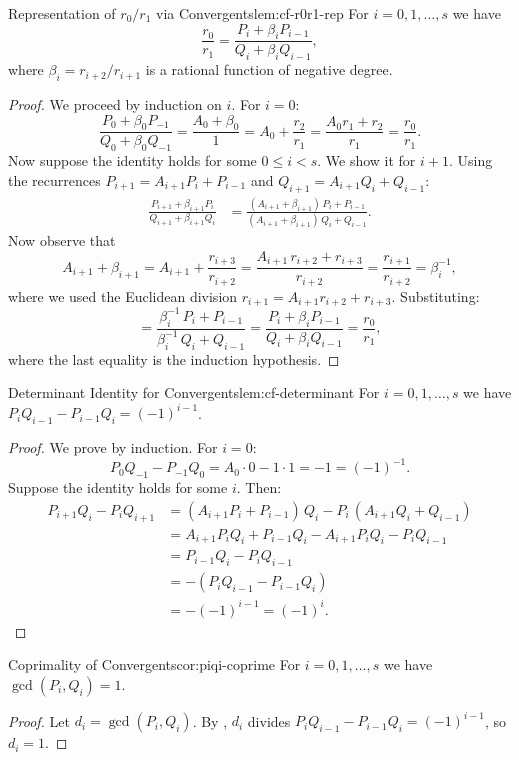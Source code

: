 \begin{Lemma}{Representation of $r_0/r_1$ via Convergents}{lem:cf-r0r1-rep}
  For $i=0,1,\dots,s$ we have
  $$\frac{r_0}{r_1}=\frac{P_i+\beta_i P_{i-1}}{Q_i+\beta_i Q_{i-1}},$$
  where $\beta_i=r_{i+2}/r_{i+1}$ is a rational function of negative degree.
\end{Lemma}
\begin{proof}
  We proceed by induction on $i$. For $i=0$:
  \[
    \frac{P_0+\beta_0 P_{-1}}{Q_0+\beta_0 Q_{-1}}
    = \frac{A_0 + \beta_0}{1}
    = A_0 + \frac{r_2}{r_1}
    = \frac{A_0 r_1 + r_2}{r_1}
    = \frac{r_0}{r_1}.
  \]
  Now suppose the identity holds for some $0\leq i<s$. We show it for $i+1$. Using the recurrences $P_{i+1}=A_{i+1}P_i+P_{i-1}$ and $Q_{i+1}=A_{i+1}Q_i+Q_{i-1}$:
  \begin{align*}
    \frac{P_{i+1}+\beta_{i+1}P_i}{Q_{i+1}+\beta_{i+1}Q_i}
    &= \frac{(A_{i+1}+\beta_{i+1})\,P_i + P_{i-1}}{(A_{i+1}+\beta_{i+1})\,Q_i + Q_{i-1}}.
  \end{align*}
  Now observe that
  \[
    A_{i+1}+\beta_{i+1}
    = A_{i+1}+\frac{r_{i+3}}{r_{i+2}}
    = \frac{A_{i+1}\,r_{i+2}+r_{i+3}}{r_{i+2}}
    = \frac{r_{i+1}}{r_{i+2}}
    = \beta_i^{-1},
  \]
  where we used the Euclidean division $r_{i+1}=A_{i+1}r_{i+2}+r_{i+3}$. Substituting:
  \[
    = \frac{\beta_i^{-1}\,P_i + P_{i-1}}{\beta_i^{-1}\,Q_i + Q_{i-1}}
    = \frac{P_i + \beta_i P_{i-1}}{Q_i + \beta_i Q_{i-1}}
    = \frac{r_0}{r_1},
  \]
  where the last equality is the induction hypothesis. 
\end{proof}

\begin{Lemma}{Determinant Identity for Convergents}{lem:cf-determinant}
  For $i=0,1,\dots,s$ we have $P_iQ_{i-1}-P_{i-1}Q_i=(-1)^{i-1}$.
\end{Lemma}
\begin{proof}
  We prove by induction. For $i=0$:
  \[
    P_0 Q_{-1} - P_{-1} Q_0 = A_0\cdot 0 - 1\cdot 1 = -1 = (-1)^{-1}.
  \]
  Suppose the identity holds for some $i$. Then:
  \begin{align*}
    P_{i+1}Q_i - P_i Q_{i+1}
    &= (A_{i+1}P_i+P_{i-1})\,Q_i - P_i\,(A_{i+1}Q_i+Q_{i-1}) \\
    &= A_{i+1}P_i Q_i + P_{i-1}Q_i - A_{i+1}P_i Q_i - P_i Q_{i-1} \\
    &= P_{i-1}Q_i - P_i Q_{i-1} \\
    &= -(P_i Q_{i-1} - P_{i-1}Q_i) \\
    &= -(-1)^{i-1} = (-1)^i. 
  \end{align*}
\end{proof}

\begin{corollary}{Coprimality of Convergents}{cor:piqi-coprime}
  For $i=0,1,\dots,s$ we have $\gcd(P_i,Q_i)=1$.
\end{corollary}
\begin{proof}
  Let $d_i=\gcd(P_i,Q_i)$. By , $d_i$ divides $P_iQ_{i-1}-P_{i-1}Q_i=(-1)^{i-1}$, so $d_i=1$. 
\end{proof}
